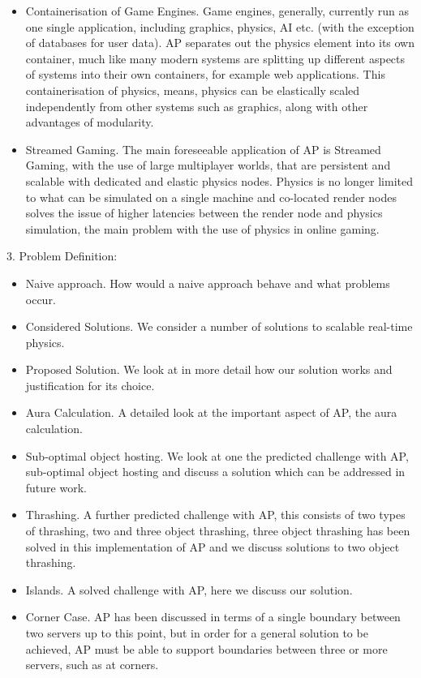 \begin{itemize}
	\item Containerisation of Game Engines. Game engines, generally, currently run as one single application, including graphics, physics, AI etc. (with the exception of databases for user data). AP separates out the physics element into its own container, much like many modern systems are splitting up different aspects of systems into their own containers, for example web applications. This containerisation of physics, means, physics can be elastically scaled independently from other systems such as graphics, along with other advantages of modularity.
	\item Streamed Gaming. The main foreseeable application of AP is Streamed Gaming, with the use of large multiplayer worlds, that are persistent and scalable with dedicated and elastic physics nodes. Physics is no longer limited to what can be simulated on a single machine and co-located render nodes solves the issue of higher latencies between the render node and physics simulation, the main problem with the use of physics in online gaming.
\end{itemize}

3. Problem Definition:
\begin{itemize}
	\item Naive approach. How would a naive approach behave and what problems occur.
	\item Considered Solutions. We consider a number of solutions to scalable real-time physics.
	\item Proposed Solution. We look at in more detail how our solution works and justification for its choice.
	\item Aura Calculation. A detailed look at the important aspect of AP, the aura calculation.
	\item Sub-optimal object hosting. We look at one the predicted challenge with AP, sub-optimal object hosting and discuss a solution which can be addressed in future work.
	\item Thrashing. A further predicted challenge with AP, this consists of two types of thrashing, two and three object thrashing, three object thrashing has been solved in this implementation of AP and we discuss solutions to two object thrashing.
	\item Islands. A solved challenge with AP, here we discuss our solution.
	\item Corner Case. AP has been discussed in terms of a single boundary between two servers up to this point, but in order for a general solution to be achieved, AP must be able to support boundaries between three or more servers, such as at corners.
\end{itemize}

